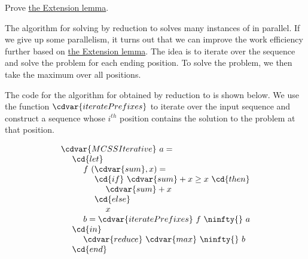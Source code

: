 \begin{cluster}
\label{grp:xrcs:mcss::prove}

\begin{exercise}
\label{xrcs:mcss::prove}
Prove 
\href{lem:mcss::reduction::mcsse-extension}{the \MCSSE{} Extension lemma}.

\end{exercise}
\end{cluster}

\begin{cluster}
\label{grp:grm:mcss::solving}

\begin{gram}
\label{grm:mcss::solving}
The algorithm for solving \MCSS{} by reduction to \MCSSE{} solves many
instances of \MCSSE{} in parallel.
If we give up some parallelism, it turns out that we can improve the
work efficiency further based on
\href{lem:mcss::reduction::mcsse-extension}{the \MCSSE{} Extension lemma}.
The idea is to iterate over the sequence and solve the \MCSSE{}
problem for each ending position.
To solve the \MCSSE{} problem, we then take the maximum over all
positions.

\end{gram}
\end{cluster}

\begin{cluster}
\label{grp:alg:mcs::iterative}

\begin{algorithm}
\label{alg:mcs::iterative}
The \PML code for the algorithm for \MCSS{} obtained by reduction to
\MCSSE{} is shown below.
We use the function $\cdvar{iteratePrefixes}$ to iterate over the input
sequence and construct a sequence whose $i^{th}$ position contains the
solution to the \MCSSE{} problem at that position.

\[
\begin{array}{l}
\cdvar{MCSSIterative}~a = 
\\
~~~~\cd{let}
\\ 
~~~~~~~~f~(\cdvar{sum},x) =
\\
~~~~~~~~~~~~\cd{if}~\cdvar{sum} + x \ge x~\cd{then}
\\ 
~~~~~~~~~~~~~~~~\cdvar{sum} + x
\\
~~~~~~~~~~~~\cd{else}
\\
~~~~~~~~~~~~~~~~x
\\ 
~~~~~~~~b = \cdvar{iteratePrefixes}~f~\ninfty{}~a
\\
~~~~\cd{in}
\\
~~~~~~~~\cdvar{reduce}~\cdvar{max}~\ninfty{}~b
\\
~~~~\cd{end}
\end{array}
\] 

\end{algorithm}
\end{cluster}

